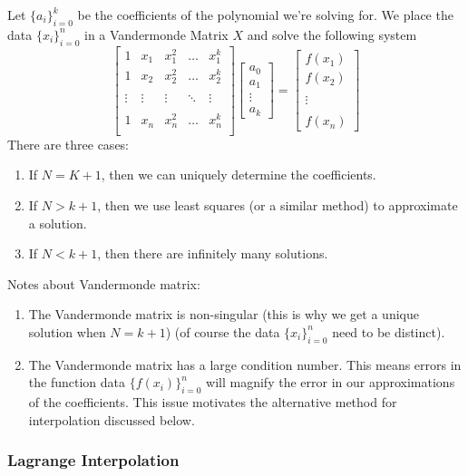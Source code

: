 \documentclass[12pt]{article}
\theoremstyle{definition}
\theoremstyle{definition}
\begin{document}
Let $\{a_i\}_{i=0}^k$ be the coefficients of the polynomial we're solving for. We place the data $\{x_i\}_{i=0}^n$ in a Vandermonde Matrix $X$ and solve the following system
\begin{equation}
	\begin{bmatrix}
	1 & x_1 & x_1^2 & \ldots & x_1^k \\
	1 & x_2 & x_2^2 & \ldots & x_2^k \\ \\
	\vdots & \vdots & \vdots & \ddots & \vdots \\ \\
	1 & x_n & x_n^2 & \ldots & x_n^k \\
	\end{bmatrix}
	\begin{bmatrix}
	a_0 \\ a_1 \\ \vdots \\ a_k
	\end{bmatrix}
	=
	\begin{bmatrix}
	f(x_1) \\ f(x_2) \\ \\ \vdots \\ \\ f(x_n)
	\end{bmatrix}
\end{equation}
There are three cases:
\begin{enumerate}
	\item If $N=K+1$, then we can uniquely determine the coefficients.
	\item If $N > k+1$, then we use least squares (or a similar method) to approximate a solution.
	\item If $N < k+1$, then there are infinitely many solutions. 
\end{enumerate}
Notes about Vandermonde matrix:
\begin{enumerate}
	\item The Vandermonde matrix is non-singular (this is why we get a unique solution when $N=k+1$) (of course the data $\{x_i\}_{i=0}^n$ need to be distinct).
	\item The Vandermonde matrix has a large condition number. This means errors in the function data $\{f(x_i)\}_{i=0}^n$ will magnify the error in our approximations of the coefficients. This issue motivates the alternative method for interpolation discussed below.
\end{enumerate}

\subsubsection{Lagrange Interpolation}
\end{document}
